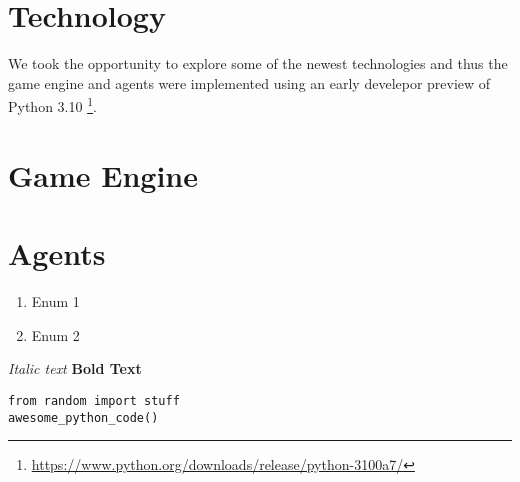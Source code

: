 \section{Technology}
We took the opportunity to explore some of the newest technologies
and thus the game engine and agents were implemented using an early develepor preview of Python 3.10
\footnote{\url{https://www.python.org/downloads/release/python-3100a7/}}.

\section{Game Engine}

\section{Agents}
\begin{enumerate}
	\item Enum 1
	\item Enum 2
\end{enumerate}

\textit{Italic text}
\textbf{Bold Text}

\lstset{language=Python}
\begin{lstlisting}
from random import stuff
awesome_python_code()
\end{lstlisting}
